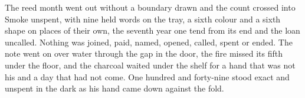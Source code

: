 The reed month went out without a boundary drawn and the count crossed into Smoke unspent, with nine held words on the tray, a sixth colour and a sixth shape on places of their own, the seventh year one tend from its end and the loan uncalled. Nothing was joined, paid, named, opened, called, spent or ended. The note went on over water through the gap in the door, the fire missed its fifth under the floor, and the charcoal waited under the shelf for a hand that was not his and a day that had not come. One hundred and forty-nine stood exact and unspent in the dark as his hand came down against the fold.
